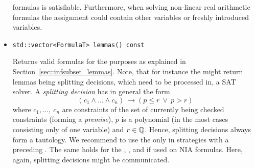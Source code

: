 \begin{itemize}
        formulas is satisfiable. Furthermore, when solving non-linear real arithmetic 
        formulas the assignment could contain other variables or freshly introduced
        variables.
    \item \begin{verbatim}std::vector<FormulaT> lemmas() const\end{verbatim}
    Returns valid formulas for the purposes as explained in Section~\ref{sec::infsubset_lemmas}. Note, 
    that for instance the \icpModule might return lemmas being splitting decisions, which need to be processed in, \eg a SAT solver. A \emph{splitting decision} has in general the form
    \[(c_1 \land \ldots \land c_n)\ \rightarrow (p \leq r\ \lor\ p > r)\]
    where $c_1,\ldots,\ c_n$ are constraints of the set of currently being checked constraints (forming a \emph{premise}), $p$ is a polynomial (in the most cases consisting only of one variable) and $r\in\mathbb{Q}$. Hence, splitting decisions always form a tautology. We recommend to use the \icpModule only in strategies with a preceding \satModule. The same holds for the \simplexModule, \vsModule, and \cadModule if used on NIA formulas. Here, again, splitting decisions might be communicated.
\end{itemize}

